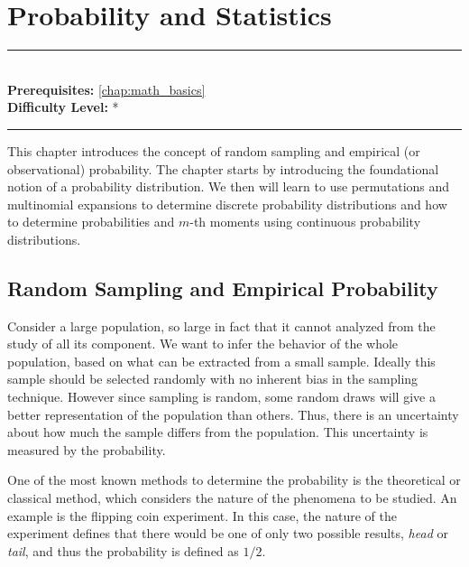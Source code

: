 \documentclass[book.tex]{subfiles}
\begin{document}
\chapter{Probability and Statistics}
\label{chap:probability}
\noindent\rule{11cm}{0.4pt} \\
\textbf{Prerequisites:} \autoref{chap:math_basics} \\
\textbf{Difficulty Level:} * \\
\noindent\rule{11cm}{0.4pt}
\vspace{5mm}

This chapter introduces the concept of random sampling and empirical (or observational) probability. The chapter starts by introducing the foundational notion of a probability distribution. We then will learn to use permutations and multinomial expansions to determine discrete probability distributions and how to determine probabilities and $m$-th moments using continuous probability distributions.



\section{Random Sampling and Empirical Probability}

Consider a large population, so large in fact that it cannot analyzed from the study of all its component. We want to infer the behavior of the whole population, based on what can be extracted from a small sample. Ideally this sample should be selected randomly with no inherent bias in the sampling technique. However since sampling is random, some random draws will give a better representation of the population than others. Thus, there is an uncertainty about how much the sample differs from the population. This uncertainty is measured by the probability.

One of the most known methods to determine the probability is the theoretical or classical method, which considers the nature of the phenomena to be studied. An example is the flipping coin experiment. In this case, the nature of the experiment defines that there would be one of only two possible results, \textit{head} or \textit{tail}, and thus the probability is defined as $1/2$.

\end{document}
